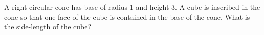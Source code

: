 A right circular cone has base of radius 1 and height 3.  A
cube is inscribed in the cone so that one face of the cube is
contained in the base of the cone.  What is the side-length of
the cube?
